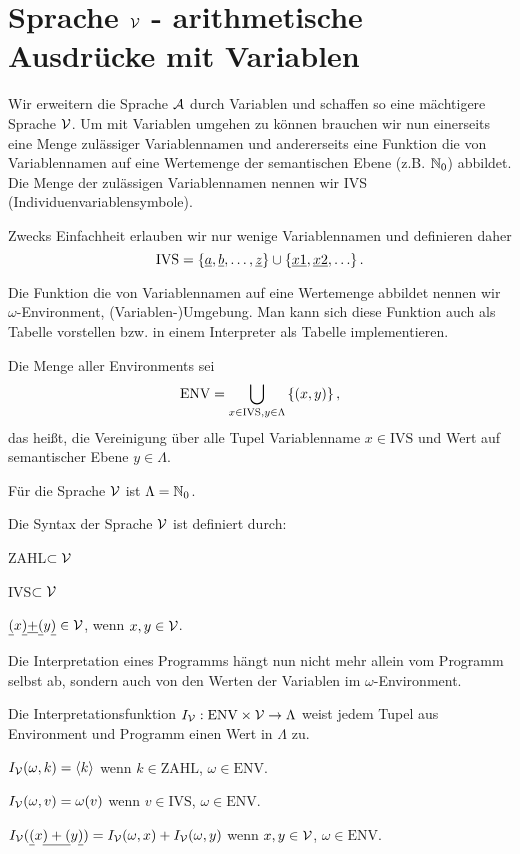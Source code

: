 \section{Sprache $\mathcal{V}$ - arithmetische Ausdrücke mit Variablen}
Wir erweitern die Sprache $\mathcal{A}$ durch Variablen und schaffen so eine mächtigere Sprache $\mathcal{V}$.
Um mit Variablen umgehen zu können brauchen wir nun einerseits eine Menge zulässiger
Variablennamen und andererseits eine Funktion die von Variablennamen auf eine Wertemenge der semantischen Ebene (z.B. $\mathbb{N}_0$) abbildet.
Die Menge der zulässigen Variablennamen nennen wir IVS (Individuenvariablensymbole).
\begin{defn}
Zwecks Einfachheit erlauben wir nur wenige Variablennamen und definieren daher
\[\text{IVS} = \left\{\underline{a},\underline{b},\ldots,\underline{z}\right\} \cup \left\{\underline{x1},\underline{x2},\ldots\right\}.\]
\end{defn}
Die Funktion die von Variablennamen auf eine Wertemenge abbildet nennen wir $\omega$-Environment, (Variablen-)Umgebung.
Man kann sich diese Funktion auch als Tabelle vorstellen bzw. in einem Interpreter als Tabelle implementieren.
\begin{defn}
Die Menge aller Environments sei
\[\text{ENV} = \bigcup_{x \in \text{IVS},y \in \Lambda} \left\{(x,y)\right\},\]
das heißt, die Vereinigung über alle Tupel Variablenname $x \in \text{IVS}$ und Wert auf semantischer Ebene $y \in \Lambda$.
\end{defn}
Für die Sprache $\mathcal{V}$ ist $\Lambda=\mathbb{N}_0$.
\begin{defn}
Die Syntax der Sprache $\mathcal{V}$ ist definiert durch:
\begin{\whichenum}
\item ZAHL$\subset \mathcal{V}$
\item IVS$\subset \mathcal{V}$
\item $\underline{(} x \underline{)} \underline{+} \underline{(} y \underline{)} \in \mathcal{V}$, wenn $x,y \in \mathcal{V}$.
\end{\whichenum}
\end{defn}
Die Interpretation eines Programms hängt nun nicht mehr allein vom Programm selbst ab,
sondern auch von den Werten der Variablen im $\omega$-Environment.
\begin{defn}
Die Interpretationsfunktion $I_{\mathcal{V}}: \text{ENV}\times\mathcal{V} \to \Lambda$
weist jedem Tupel aus Environment und Programm einen Wert in $\Lambda$ zu.
\begin{\whichenum}
\item $I_{\mathcal{V}}(\omega,k) = \left<k\right>$ wenn $k \in \text{ZAHL}$, $\omega \in \text{ENV}$.
\item $I_{\mathcal{V}}(\omega,v) = \omega(v)$ wenn $v \in \text{IVS}$, $\omega \in \text{ENV}$.
\item $I_{\mathcal{V}}(\underline{(}x\underline{)+(}y\underline{)})=I_{\mathcal{V}}(\omega,x) + I_{\mathcal{V}}(\omega,y)$ wenn $x,y \in \mathcal{V}$, $\omega \in \text{ENV}$.
\end{\whichenum}
\end{defn}
